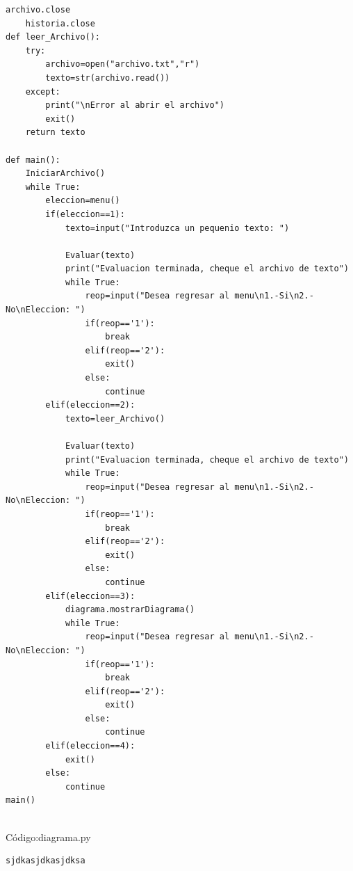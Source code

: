 \begin{lstlisting}[frame=single]
    archivo.close
    historia.close
def leer_Archivo():
    try:
        archivo=open("archivo.txt","r")
        texto=str(archivo.read())
    except:
        print("\nError al abrir el archivo")
        exit()
    return texto

def main():
    IniciarArchivo()
    while True:
        eleccion=menu()
        if(eleccion==1):
            texto=input("Introduzca un pequenio texto: ")

            Evaluar(texto)
            print("Evaluacion terminada, cheque el archivo de texto")
            while True:
                reop=input("Desea regresar al menu\n1.-Si\n2.-No\nEleccion: ")
                if(reop=='1'):
                    break
                elif(reop=='2'):
                    exit()
                else:
                    continue
        elif(eleccion==2):
            texto=leer_Archivo()

            Evaluar(texto)
            print("Evaluacion terminada, cheque el archivo de texto")
            while True:
                reop=input("Desea regresar al menu\n1.-Si\n2.-No\nEleccion: ")
                if(reop=='1'):
                    break
                elif(reop=='2'):
                    exit()
                else:
                    continue
        elif(eleccion==3):
            diagrama.mostrarDiagrama()
            while True:
                reop=input("Desea regresar al menu\n1.-Si\n2.-No\nEleccion: ")
                if(reop=='1'):
                    break
                elif(reop=='2'):
                    exit()
                else:
                    continue
        elif(eleccion==4):
            exit()
        else:
            continue
main()


\end{lstlisting}
\vspace{1.5cm}
C\'odigo:diagrama.py

\lstset{language=Python, breaklines=true, basicstyle=\footnotesize}
\begin{lstlisting}[frame=single]
	sjdkasjdkasjdksa
\end{lstlisting}

\newpage

